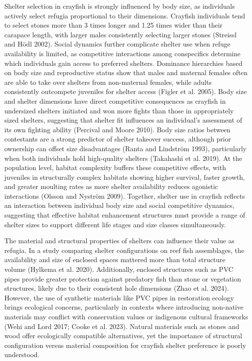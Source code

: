 \documentclass[
  12pt,
  a4paper,
]{scrbook}
\begin{document}
Shelter selection in crayfish is strongly influenced by body size, as
individuals actively select refugia proportional to their dimensions.
Crayfish individuals tend to select stones more than 3 times longer and
1.25 times wider than their carapace length, with larger males
consistently selecting larger stones (Streissl and Hödl 2002). Social
dynamics further complicate shelter use when refuge availability is
limited, as competitive interactions among conspecifics determine which
individuals gain access to preferred shelters. Dominance hierarchies
based on body size and reproductive status show that males and maternal
females often are able to take over shelters from non-maternal females,
while adults consistently outcompete juveniles for shelter access
(Figler et al. 2005). Body size and shelter dimensions have direct
competitive consequences as crayfish in undersized shelters initiated
and won more fights than those in appropriately sized shelters,
suggesting that shelter fit influences an individual's assessment of its
own fighting ability (Percival and Moore 2010). Body size ratios between
contestants are a strong predictor of shelter takeover success, although
prior ownership can offset size disadvantages (Ranta and Lindström
1993), particularly when both individuals hold high-quality shelters
(Takahashi et al. 2019). At the population level, habitat complexity
buffers these competitive effects, with juveniles in structurally
complex habitats showing higher survival, faster growth, and greater
moulting rates as more shelter availability reduces agonistic
interactions (Olsson and Nyström 2009). Together, shelter use in
crayfish reflects an interaction between individual body size and social
competitive dynamics, suggesting that effective habitat enhancement
structures must provide a range of shelter sizes to support different
life stages and size classes simultaneously.

The material and structural properties of shelters can influence their
value as refugia. In a study comparing shelter configurations on reef
fish assemblages, the availability and size of enclosed spaces mattered
more than total structure volume (Hylkema et al. 2020). Additionally,
enclosed structures such as PVC pipes provide greater protection against
predatory fish than stone or vegetation structures, likely due to their
consistent hole dimensions (Zhao et al. 2024). However, the use of
synthetic materials like PVC pipes in restoration ecology brings
ecological concerns, particularly in contexts where introducing
non-native materials may conflict with conservation values or indigenous
cultural frameworks (Wehi and Lord 2017; Cooke et al. 2023). Natural
materials such as stones and wood offer ecologically compatible
alternatives, yet the importance of structural configuration versus
material composition for crayfish shelter preference is poorly
understood.
\end{document}

